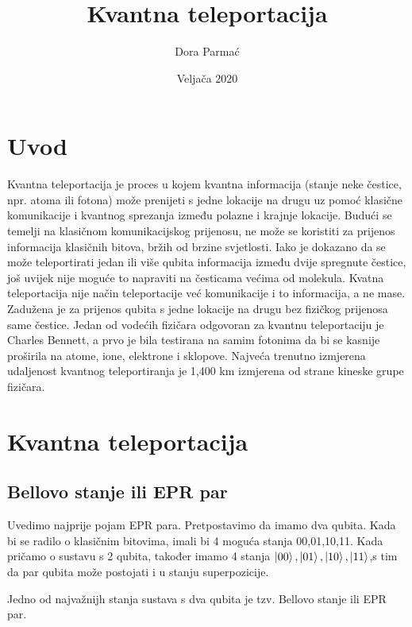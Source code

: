 \documentclass{article}
\title{Kvantna teleportacija}
\author {Dora Parmać}
\date{Veljača 2020}
\begin{document}
	\newpage 
	\maketitle
	
	
	\section{Uvod}
	
	
	Kvantna teleportacija je proces u kojem kvantna informacija (stanje neke čestice, npr. atoma ili fotona) može prenijeti s jedne lokacije na drugu uz pomoć klasične komunikacije i kvantnog sprezanja između polazne i krajnje lokacije. \newline
	Budući se temelji na klasičnom komunikacijskog prijenosu, ne može se koristiti za prijenos informacija klasičnih bitova, bržih od brzine svjetlosti. \newline
	Iako je dokazano da se može teleportirati jedan ili više qubita informacija između dvije spregnute čestice, još uvijek nije moguće to napraviti na česticama većima od molekula.\newline
	Kvatna teleportacija nije način teleportacije već komunikacije i to informacija, a ne mase. Zadužena je za prijenos qubita s jedne lokacije na drugu bez fizičkog prijenosa same čestice.\newline
	Jedan od vodećih fizičara odgovoran za kvantnu teleportaciju je Charles Bennett, a prvo je bila testirana na samim fotonima da bi se kasnije proširila na atome, ione, elektrone i sklopove.
	Najveća trenutno izmjerena udaljenost kvantnog teleportiranja je 1,400 km izmjerena od strane kineske grupe fizičara.
	\newpage
	\section{ Kvantna teleportacija}
	\subsection{ Bellovo stanje ili EPR par}
	\newline
	Uvedimo najprije pojam EPR para.
	Pretpostavimo da imamo dva qubita. Kada bi se radilo o klasičnim bitovima, imali bi 4 moguća stanja 00,01,10,11. Kada pričamo o sustavu s 2 qubita, također imamo 4 stanja $\ket {00}, \ket {01},\ket {10},\ket {11}$,s tim da par qubita može postojati 
	i u stanju superpozicije. 
	
	Jedno od najvažnijh stanja sustava s dva qubita je tzv. Bellovo stanje ili EPR par.
	
\end{document}

